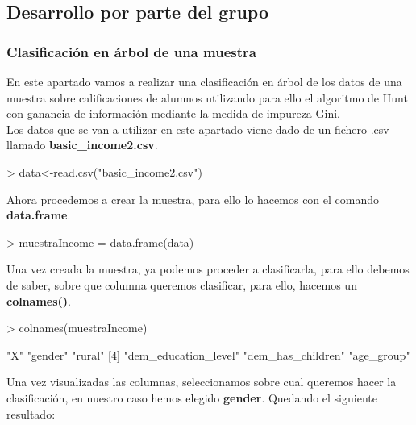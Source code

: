 \documentclass [a4paper] {article}
\begin{document}
\subsection{Desarrollo por parte del grupo}

\subsubsection{Clasificación en árbol de una muestra}
En este apartado vamos a realizar una clasificación en árbol de los datos de una muestra sobre calificaciones
de alumnos utilizando para ello el algoritmo de Hunt con ganancia de información mediante la medida de impureza
Gini.\\

Los datos que se van a utilizar en este apartado viene dado de un fichero .csv llamado \textbf{basic\_income2.csv}.

\begin{Schunk}
\begin{Sinput}
> data<-read.csv("basic_income2.csv")
\end{Sinput}
\end{Schunk}

Ahora procedemos a crear la muestra, para ello lo hacemos con el comando \textbf{data.frame}.

\begin{Schunk}
\begin{Sinput}
> muestraIncome = data.frame(data)
\end{Sinput}
\end{Schunk}

Una vez creada la muestra, ya podemos proceder a clasificarla, para ello debemos de saber, sobre que columna
queremos clasificar, para ello, hacemos un \textbf{colnames()}.

\begin{Schunk}
\begin{Sinput}
> colnames(muestraIncome)
\end{Sinput}
\begin{Soutput}
[1] "X"                   "gender"              "rural"              
[4] "dem_education_level" "dem_has_children"    "age_group"          
\end{Soutput}
\end{Schunk}

Una vez visualizadas las columnas, seleccionamos sobre cual queremos hacer la clasificación, en nuestro caso hemos 
elegido \textbf{gender}. Quedando el siguiente resultado:
\end{document}
